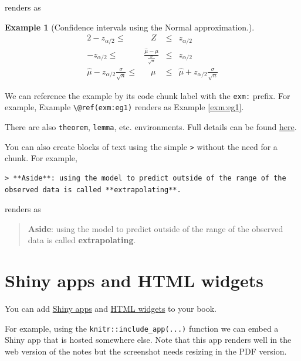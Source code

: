 \documentclass[
]{book}
\theoremstyle{definition}
\theoremstyle{definition}
\newtheorem{example}{Example}[chapter]
\theoremstyle{definition}
\theoremstyle{remark}
\begin{document}
renders as

\begin{example}[Confidence intervals using the Normal approximation.]
\protect\hypertarget{exm:eg1}{}{\label{exm:eg1} {} }\begin{alignat*}{2}
-z_{\alpha/2} \leq{} & \;\;\;Z & \leq{} & z_{\alpha/2} \\
-z_{\alpha/2} \leq{} & \frac{\hat{\mu}-\mu}{\frac{\sigma}{\sqrt{n}}} & \leq{} & z_{\alpha/2}\\
\hat{\mu} - z_{\alpha/2}\frac{\sigma}{\sqrt{n}} \leq{} & \;\;\;\mu & \leq{} & \hat{\mu} + z_{\alpha/2}\frac{\sigma}{\sqrt{n}}
\end{alignat*}
\end{example}

We can reference the example by its code chunk label with the \texttt{exm:} prefix. For example, Example \texttt{\textbackslash{}@ref(exm:eg1)} renders as Example \ref{exm:eg1}.

There are also \texttt{theorem}, \texttt{lemma}, etc. environments. Full details can be found \href{https://bookdown.org/yihui/bookdown/markdown-extensions-by-bookdown.html}{here}.

You can also create blocks of text using the simple \texttt{\textgreater{}} without the need for a chunk. For example,

\begin{verbatim}
> **Aside**: using the model to predict outside of the range of the observed data is called **extrapolating**.
\end{verbatim}

renders as

\begin{quote}
\textbf{Aside}: using the model to predict outside of the range of the observed data is called \textbf{extrapolating}.
\end{quote}

\hypertarget{shiny-apps-and-html-widgets}{%
\section{Shiny apps and HTML widgets}\label{shiny-apps-and-html-widgets}}

You can add \href{https://bookdown.org/yihui/bookdown/web-pages-and-shiny-apps.html}{Shiny apps} and \href{https://bookdown.org/yihui/bookdown/html-widgets.html}{HTML widgets} to your book.

For example, using the \texttt{knitr::include\_app(...)} function we can embed a Shiny app that is hosted somewhere else.
Note that this app renders well in the web version of the notes but the screenshot needs resizing in the PDF version.
\end{document}
